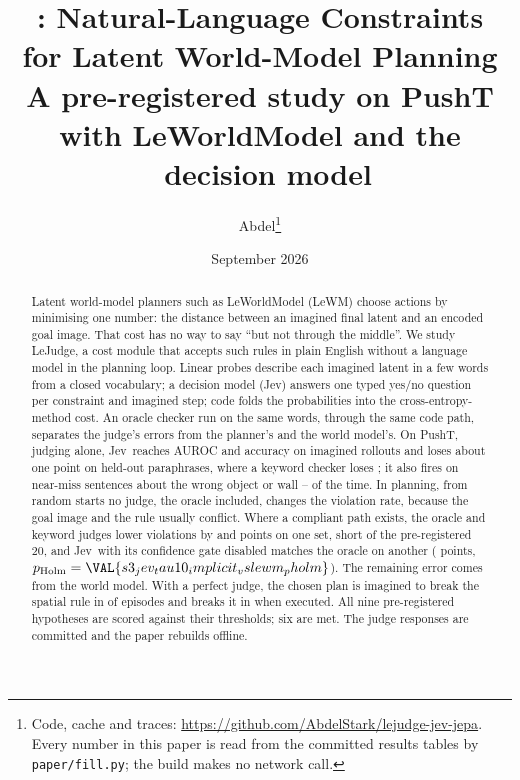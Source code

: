 \documentclass[11pt]{article}
\title{\lejudge: Natural-Language Constraints\\for Latent World-Model Planning\\[6pt]\large A pre-registered study on PushT with LeWorldModel and the \jev\ decision model}
\author{Abdel\thanks{Code, cache and traces: \url{https://github.com/AbdelStark/lejudge-jev-jepa}. Every number in this paper is read from the committed results tables by \texttt{paper/fill.py}; the build makes no network call.}}
\date{September 2026}
\newcommand{\lejudge}{LeJudge}
\newcommand{\jev}{Jev}
\newcommand{\lewm}{LeWM}
\begin{document}
\maketitle

\begin{abstract}
Latent world-model planners such as LeWorldModel (\lewm) choose actions by minimising one number: the distance between an imagined final latent and an encoded goal image. That cost has no way to say ``but not through the middle''. We study \lejudge, a cost module that accepts such rules in plain English without a language model in the planning loop. Linear probes describe each imagined latent in a few words from a closed vocabulary; a decision model (\jev) answers one typed yes/no question per constraint and imagined step; code folds the probabilities into the cross-entropy-method cost. An oracle checker run on the same words, through the same code path, separates the judge's errors from the planner's and the world model's. On PushT, judging alone, \jev\ reaches  AUROC and  accuracy on imagined rollouts and loses about one point on held-out paraphrases, where a keyword checker loses ; it also fires on near-miss sentences about the wrong object or wall -- of the time. In planning, from random starts no judge, the oracle included, changes the violation rate, because the goal image and the rule usually conflict. Where a compliant path exists, the oracle and keyword judges lower violations by  and  points on one set, short of the pre-registered 20, and \jev\ with its confidence gate disabled matches the oracle on another ( points, $p_{\mathrm{Holm}}=\VAL{s3_jev_tau10_implicit_vslewm_pholm}$). The remaining error comes from the world model. With a perfect judge, the chosen plan is imagined to break the spatial rule in  of episodes and breaks it in  when executed. All nine pre-registered hypotheses are scored against their thresholds; six are met. The  judge responses are committed and the paper rebuilds offline.
\end{abstract}
\end{document}
